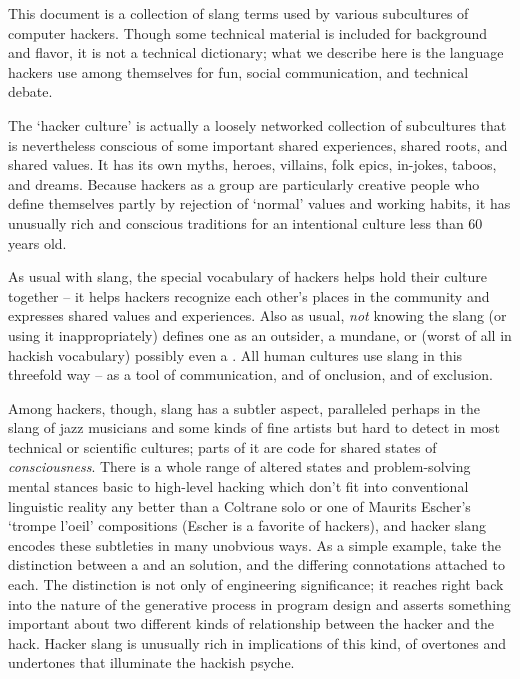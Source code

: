 This document is a collection of slang terms used by various subcultures of
computer hackers. Though some technical material is included for background and
flavor, it is not a technical dictionary; what we describe here is the language
hackers use among themselves for fun, social communication, and technical
debate.

The `hacker culture' is actually a loosely networked collection of subcultures
that is nevertheless conscious of some important shared experiences, shared
roots, and shared values. It has its own myths, heroes, villains, folk epics,
in-jokes, taboos, and dreams. Because hackers as a group are particularly
creative people who define themselves partly by rejection of `normal' values
and working habits, it has unusually rich and conscious traditions for an
intentional culture less than 60 years old.

As usual with slang, the special vocabulary of hackers helps hold their culture
together -- it helps hackers recognize each other's places in the community and
expresses shared values and experiences. Also as usual, \textit{not} knowing the
slang (or using it inappropriately) defines one as an outsider, a mundane, or
(worst of all in hackish vocabulary) possibly even a . All human
cultures use slang in this threefold way -- as a tool of communication, and of
onclusion, and of exclusion.

Among hackers, though, slang has a subtler aspect, paralleled perhaps in the
slang of jazz musicians and some kinds of fine artists but hard to detect in
most technical or scientific cultures; parts of it are code for shared states of
\textit{consciousness}. There is a whole range of altered states and
problem-solving mental stances basic to high-level hacking which don't fit into
conventional linguistic reality any better than a Coltrane solo or one of
Maurits Escher's `trompe l'oeil' compositions (Escher is a favorite of hackers),
and hacker slang encodes these subtleties in many unobvious ways. As a simple
example, take the distinction between a  and an
 solution, and the differing connotations attached to each.
The distinction is not only of engineering significance; it reaches right back
into the nature of the generative process in program design and asserts
something important about two different kinds of relationship between the hacker
and the hack. Hacker slang is unusually rich in implications of this kind, of
overtones and undertones that illuminate the hackish psyche.

